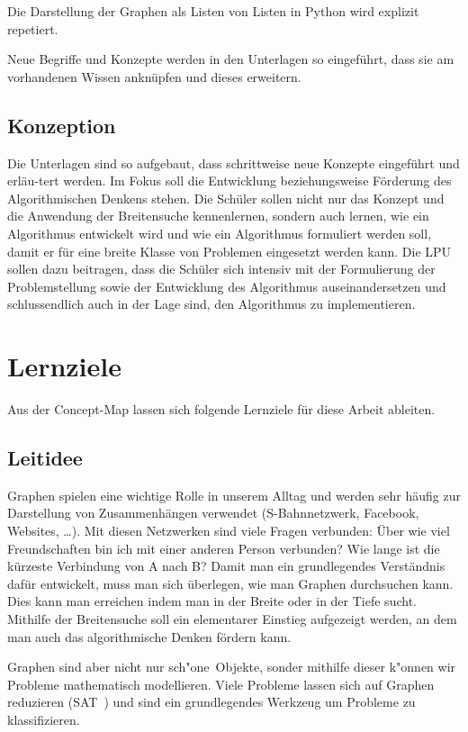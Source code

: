 Die Darstellung der Graphen als Listen von Listen in Python wird explizit repetiert.


Neue Begriffe und Konzepte werden in den Unterlagen so eingef\"uhrt, dass sie am vorhandenen Wissen ankn\"upfen und dieses erweitern.

\subsection{Konzeption}
Die Unterlagen sind so aufgebaut, dass schrittweise neue Konzepte eingef\"uhrt und erläu-tert werden. Im Fokus soll die Entwicklung beziehungsweise F\"orderung des Algorithmischen Denkens stehen. Die Sch\"uler sollen nicht nur das Konzept und die Anwendung der Breitensuche kennenlernen, sondern auch lernen, wie ein Algorithmus entwickelt wird und wie ein Algorithmus formuliert werden soll, damit er f\"ur eine breite Klasse von Problemen eingesetzt werden kann. Die LPU sollen dazu beitragen, dass die Sch\"uler sich intensiv mit der Formulierung der Problemstellung sowie der Entwicklung des Algorithmus auseinandersetzen und schlussendlich auch in der Lage sind, den Algorithmus zu implementieren.


\section{Lernziele}

Aus der Concept-Map lassen sich folgende Lernziele für diese Arbeit ableiten. 

\subsection{Leitidee}

Graphen spielen eine wichtige Rolle in unserem Alltag und werden sehr häufig zur Darstellung von Zusammenhängen verwendet (S-Bahnnetzwerk, Facebook, Websites, \dots). 
Mit diesen Netzwerken sind viele Fragen verbunden: Über wie viel Freundschaften bin ich mit einer anderen Person verbunden? Wie lange ist die kürzeste Verbindung von A nach B?
Damit man ein grundlegendes Verständnis dafür entwickelt, muss man sich überlegen, wie man Graphen durchsuchen kann. 
Dies kann man erreichen indem man in der Breite oder in der Tiefe sucht. 
Mithilfe der Breitensuche soll ein elementarer Einstieg aufgezeigt werden, an dem man auch das algorithmische Denken fördern kann.

Graphen sind aber nicht nur \glqq sch"one\grqq\ Objekte, sonder mithilfe dieser k"onnen wir Probleme mathematisch modellieren. 
Viele Probleme lassen sich auf Graphen reduzieren (SAT~\cite{hrom1}) und sind ein grundlegendes Werkzeug um Probleme zu klassifizieren. 


